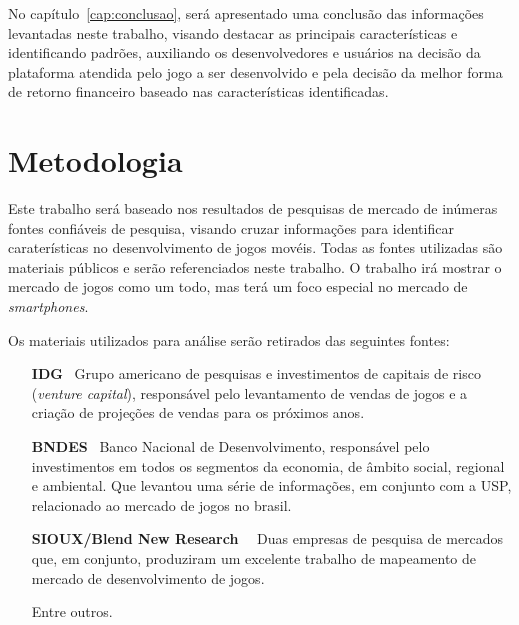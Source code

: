 No capítulo~\ref{cap:conclusao}, será apresentado uma conclusão das informações levantadas neste trabalho, visando destacar as principais características e identificando padrões, auxiliando os desenvolvedores e usuários na decisão da plataforma atendida pelo jogo a ser desenvolvido e pela decisão da melhor forma de retorno financeiro baseado nas características identificadas.



\section{Metodologia}

Este trabalho será baseado nos resultados de pesquisas de mercado de inúmeras fontes confiáveis de pesquisa, visando cruzar informações para identificar caraterísticas no desenvolvimento de jogos movéis. Todas as fontes utilizadas são materiais públicos e serão referenciados neste trabalho.\newline
O trabalho irá mostrar o mercado de jogos como um todo, mas terá um foco especial no mercado de \emph{smartphones}.



Os materiais utilizados para análise serão retirados das seguintes fontes:

\begin{itemize}

	\item [\textbf{IDG}~\cite{idg}] Grupo americano de pesquisas e investimentos de capitais de risco (\emph{venture capital}), responsável pelo levantamento de vendas de jogos e a criação de projeções de vendas para os próximos anos.

	\item [\textbf{BNDES}~\cite{bndes}] Banco Nacional de Desenvolvimento, responsável pelo investimentos em todos os segmentos da economia, de âmbito social, regional e ambiental. Que levantou uma série de informações, em conjunto com a USP, relacionado ao mercado de jogos no brasil.
	
	\item[\textbf{SIOUX/Blend New Research}~\cite{sioux}~\cite{blend}] Duas empresas de pesquisa de mercados que, em conjunto, produziram um excelente trabalho de mapeamento de mercado de desenvolvimento de jogos.
	
	\item [Entre outros.]

\end{itemize}





